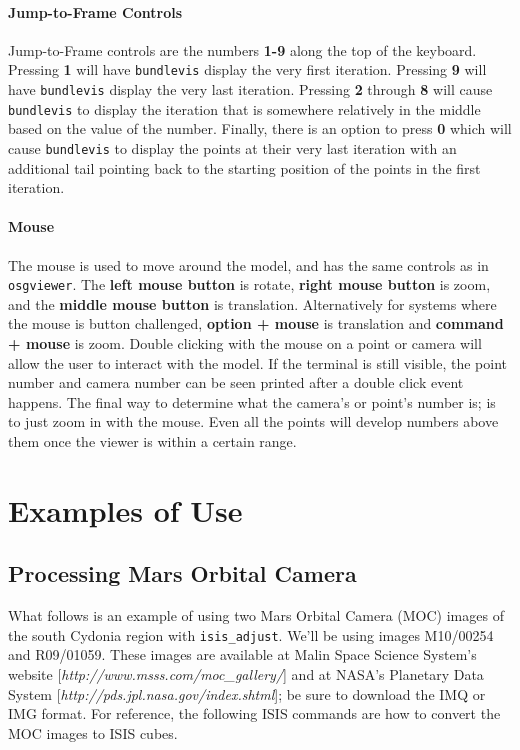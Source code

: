 \paragraph{Jump-to-Frame Controls}
Jump-to-Frame controls are the numbers \textbf{1-9} along the top of the
keyboard. Pressing \textbf{1} will have \texttt{bundlevis} display the
very first iteration. Pressing \textbf{9} will have \texttt{bundlevis}
display the very last iteration. Pressing \textbf{2} through
\textbf{8} will cause \texttt{bundlevis} to display the iteration that
is somewhere relatively in the middle based on the value of the
number. Finally, there is an option to press \textbf{0} which will
cause \texttt{bundlevis} to display the points at their very last
iteration with an additional tail pointing back to the starting
position of the points in the first iteration.

\paragraph{Mouse}
The mouse is used to move around the model, and has the same controls
as in \texttt{osgviewer}. The \textbf{left mouse button} is rotate,
\textbf{right mouse button} is zoom, and the \textbf{middle mouse
  button} is translation. Alternatively for systems where the mouse is
button challenged, \textbf{option + mouse} is translation and
\textbf{command + mouse} is zoom. Double clicking with the mouse on a
point or camera will allow the user to interact with the model. If the
terminal is still visible, the point number and camera number can be
seen printed after a double click event happens. The final way to
determine what the camera's or point's number is; is to just zoom in
with the mouse. Even all the points will develop numbers above them
once the viewer is within a certain range.

\section{Examples of Use}

\subsection{Processing Mars Orbital Camera}

What follows is an example of using two Mars Orbital Camera (MOC)
images of the south Cydonia region with \texttt{isis\_adjust}. We'll
be using images M10/00254 and R09/01059. These images are available
at Malin Space Science System's website
[\emph{http://www.msss.com/moc\_gallery/}] and at NASA's Planetary
Data System [\emph{http://pds.jpl.nasa.gov/index.shtml}]; be sure to
download the IMQ or IMG format. For reference, the following ISIS commands
are how to convert the MOC images to ISIS cubes.

